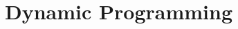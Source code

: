 \documentclass[../Notes/main.tex]{subfiles}
\begin{document}
\section{Dynamic Programming}
\end{document}
